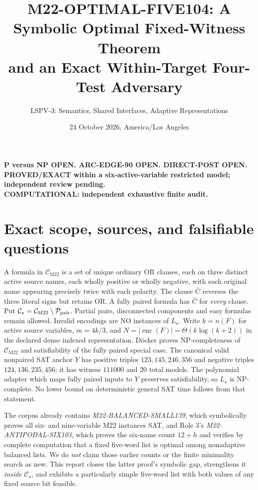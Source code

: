 \documentclass[11pt]{article}
\title{M22-OPTIMAL-FIVE104: A Symbolic Optimal Fixed-Witness Theorem\\and an Exact Within-Target Four-Test Adversary}
\author{LSPV-3: Semantics, Shared Interfaces, Adaptive Representations}
\date{24 October 2026, America/Los Angeles}
\newcommand{\CM}{\mathcal C_{\mathrm{M22}}}
\newcommand{\CS}{\mathcal C_\star}
\begin{document}
\maketitle
\begin{center}
\textbf{P versus NP OPEN. ARC-EDGE-90 OPEN. DIRECT-POST OPEN.}\\
\textbf{PROVED/EXACT within a six-active-variable restricted model; independent review pending.}\\
\textbf{COMPUTATIONAL: independent exhaustive finite audit.}
\end{center}

\section{Exact scope, sources, and falsifiable questions}
A formula in $\CM$ is a set of unique ordinary OR clauses, each on three distinct active source names, each wholly positive or wholly negative, with each original name appearing precisely twice with each polarity. The clause $\bar C$ reverses the three literal signs but retains OR. A fully paired formula has $\bar C$ for \emph{every} clause. Put $\CS=\CM\setminus\mathcal P_{\rm pair}$. Partial pairs, disconnected components and easy formulas remain allowed. Invalid encodings are NO instances of $L_\star$. Write $k=n(F)$ for active source variables, $m=4k/3$, and $N=|\operatorname{enc}(F)|=\Theta(k\log(k+2))$ in the declared dense indexed representation.
D\"ocker \cite{docker} proves NP-completeness of $\CM$ and satisfiability of the fully paired special case. The canonical valid nonpaired SAT anchor $Y$ has positive triples $123,145,246,356$ and negative triples $124,136,235,456$; it has witness $111000$ and 20 total models. The polynomial adapter which maps fully paired inputs to $Y$ preserves satisfiability, so $L_\star$ is NP-complete. No lower bound on deterministic general SAT time follows from that statement.

The corpus already contains \emph{M22-BALANCED-SMALL139}, which symbolically proves all six- and nine-variable M22 instances SAT, and Role 3's \emph{M22-ANTIPODAL-SIX103}, which proves the six-name count $12+h$ and verifies by complete computation that a fixed five-word list is optimal among nonadaptive balanced lists. We do \emph{not} claim those earlier counts or the finite minimality search as new. This report closes the latter proof's symbolic gap, strengthens it \emph{inside} $\CS$, and exhibits a particularly simple five-word list with both values of any fixed source bit feasible.
\end{document}
